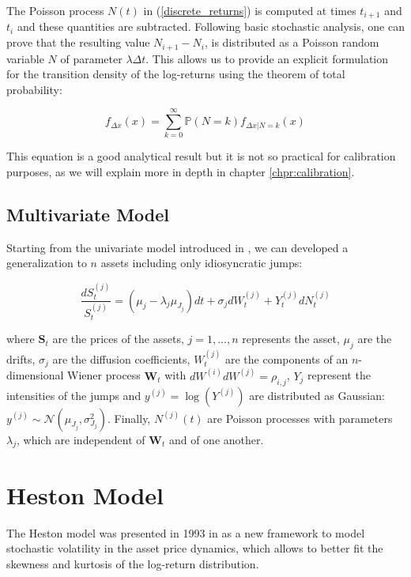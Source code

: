 The Poisson process $N(t)$ in (\ref{discrete_returns}) is computed at times $t_{i+1}$ and $t_i$ and these quantities are subtracted. Following basic stochastic analysis, one can prove that the resulting value $N_{i+1} - N_i$,  is distributed as a Poisson random variable $N$ of parameter $\lambda \Delta t$.
This allows us to provide an explicit formulation for the transition density of the log-returns using the theorem of total probability:

\begin{equation}
\label{transitional}
f_{\Delta x} (x) = \sum_{k=0}^{\infty} \mathbb{P}(N = k) f_{\Delta x | N = k}(x) 
\end{equation}

This equation is a good analytical result but it is not so practical for calibration purposes, as we will explain more in depth in chapter \ref{chpr:calibration}.


\subsection{Multivariate Model}
Starting from the univariate model introduced in \citep{MERTON1976}, we can developed a generalization to $n$ assets including only idiosyncratic jumps:

\begin{equation}
\frac{dS_t^{(j)}}{S_t^{(j)}} = (\mu_j - \lambda_j \mu_{J_j}) dt + \sigma_j dW_t^{(j)} + Y^{(j)}_t dN^{(j)}_t
\end{equation}

where $\mathbf{S}_t$ are the prices of the assets, $j = 1, ...  ,n$ represents the asset, $\mu_j$ are the drifts, $\sigma_j$ are the diffusion coefficients, $W^{(j)}_t$ are the components of an $n$-dimensional Wiener process $ \mathbf{W}_t$ with $dW^{(i)}dW^{(j)}=\rho_{i,j}$, $Y_j$ represent the intensities of the jumps and  $y^(j) = \log(Y^{(j)})$ are distributed as Gaussian: $y^(j)  \sim \mathcal{N}(\mu_{J_j} , \sigma_{J_j}^2)$. Finally, $N^{(j)}(t)$ are Poisson processes with parameters $\lambda_j$, which are independent of $\mathbf{W}_t$ and of one another. 

\bigskip

\section{Heston Model}
\label{sec:heston}

The Heston model was presented in 1993 in \citep{HESTON93} as a new framework to model stochastic volatility in the asset price dynamics, which allows to better fit the skewness and kurtosis of the log-return distribution.

